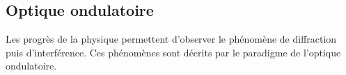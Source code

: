 \subsection{Optique ondulatoire}
Les progrès de la physique permettent d'observer le phénomène de diffraction puis d'interférence. Ces phénomènes sont décrits par le paradigme de l'optique ondulatoire.



\subsection{}\subsection{}
\begin{center}
\end{center}

